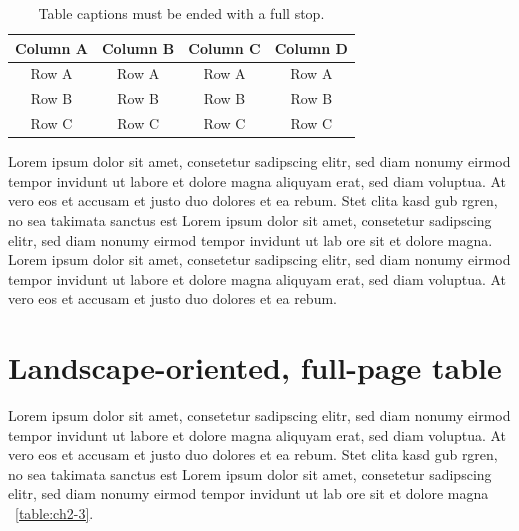 \vspace{6pt} %
\begin{table}[!ht]
\centering
\setlength{\tabcolsep}{14pt}
\caption{Table captions must be ended with a full stop.}
\begin{tabular}{cccc}
\toprule\midrule
Column A & Column B & Column C & Column D \\
\midrule
Row A & Row A & Row A & Row A \\
Row B & Row B & Row B & Row B \\
Row C & Row C & Row C & Row C \\
\bottomrule
\end{tabular}
\label{table:ch2-2}
\end{table}
\vspace{-6pt} %

Lorem ipsum dolor sit amet, consetetur sadipscing elitr, sed diam nonumy eirmod tempor invidunt ut labore et dolore magna aliquyam erat, sed diam voluptua. At vero eos et accusam et justo duo dolores et ea rebum. Stet clita kasd gub rgren, no sea takimata sanctus est Lorem ipsum dolor sit amet, consetetur sadipscing elitr, sed diam nonumy eirmod tempor invidunt ut lab ore sit et dolore magna. Lorem ipsum dolor sit amet, consetetur sadipscing elitr, sed diam nonumy eirmod tempor invidunt ut labore et dolore magna aliquyam erat, sed diam voluptua. At vero eos et accusam et justo duo dolores et ea rebum. 

\section{Landscape-oriented, full-page table}

Lorem ipsum dolor sit amet, consetetur sadipscing elitr, sed diam nonumy eirmod tempor invidunt ut labore et dolore magna aliquyam erat, sed diam voluptua. At vero eos et accusam et justo duo dolores et ea rebum. Stet clita kasd gub rgren, no sea takimata sanctus est Lorem ipsum dolor sit amet, consetetur sadipscing elitr, sed diam nonumy eirmod tempor invidunt ut lab ore sit et dolore magna \tablename\ \ref{table:ch2-3}. \vfill\phantom{.}

